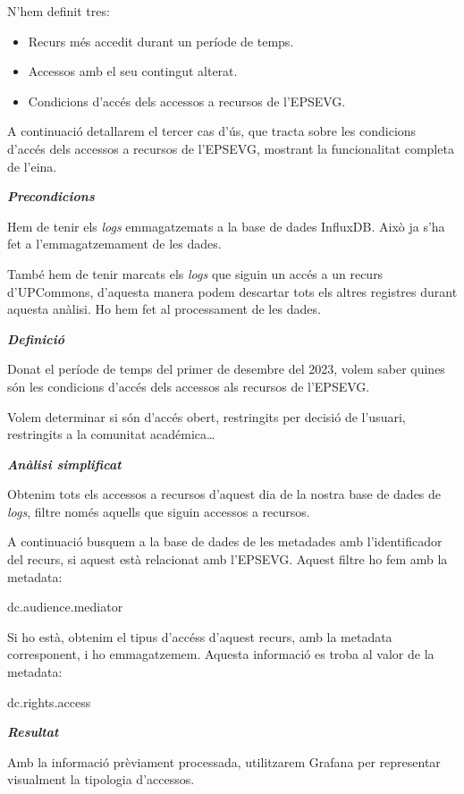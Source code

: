 \documentclass[lettersize,journal]{IEEEtran}
\begin{document}
N'hem definit tres:
\begin{itemize}
    \item Recurs més accedit durant un període de temps.
    \item Accessos amb el seu contingut alterat.
    \item Condicions d'accés dels accessos a recursos de l'EPSEVG.
\end{itemize}

A continuació detallarem el tercer cas d'ús, que tracta sobre les condicions d'accés dels accessos a recursos de l'EPSEVG, mostrant la funcionalitat completa de l'eina.

\textit{\textbf{Precondicions}}

Hem de tenir els \textit{logs} emmagatzemats a la base de dades InfluxDB.
Això ja s'ha fet a l'emmagatzemament de les dades.

També hem de tenir marcats els \textit{logs} que siguin un accés a un recurs d'UPCommons, d'aquesta manera podem descartar tots els altres registres durant aquesta anàlisi.
Ho hem fet al processament de les dades.

\textit{\textbf{Definició}}

Donat el període de temps del primer de desembre del 2023, volem saber quines són les condicions d'accés dels accessos als recursos de l'EPSEVG.

Volem determinar si són d'accés obert, restringits per decisió de l'usuari, restringits a la comunitat académica\dots

\textit{\textbf{Anàlisi simplificat}}

Obtenim tots els accessos a recursos d'aquest dia de la nostra base de dades de \textit{logs}, filtre només aquells que siguin accessos a recursos.

A continuació busquem a la base de dades de les metadades amb l'identificador del recurs, si aquest està relacionat amb l'EPSEVG.
Aquest filtre ho fem amb la metadata:
\begin{center}
    {dc.audience.mediator}
\end{center}

Si ho està, obtenim el tipus d'accéss d'aquest recurs, amb la metadata corresponent, i ho emmagatzemem.
Aquesta informació es troba al valor de la metadata:
\begin{center}
    {dc.rights.access}
\end{center}

\textit{\textbf{Resultat}}

Amb la informació prèviament processada, utilitzarem Grafana per representar visualment la tipologia d'accessos.
\end{document}
